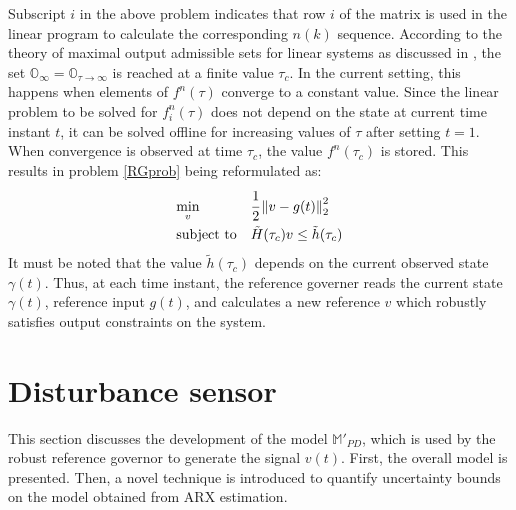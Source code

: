 \documentclass[letterpaper, 10 pt, conference]{ieeeconf}  %
\newcommand{\norm}[1]{\left\lVert#1\right\rVert}
\begin{document}
	Subscript $i$ in the above problem indicates that row $i$ of the matrix is used in the linear program to calculate the corresponding $n(k)$ sequence. According to the theory of maximal output admissible sets for linear systems as discussed in \cite{83532}, the set $\mathbb{O}_{\infty} = \mathbb{O}_{\tau \to \infty}$ is reached at a finite value $\tau_c$. In the current setting, this happens when elements of $f^n(\tau)$ converge to a constant value. Since the linear problem to be solved for $f_i^n(\tau)$ does not depend on the state at current time instant $t$, it can be solved offline for increasing values of $\tau$ after setting $t=1$. When convergence is observed at time $\tau_c$, the value $f^n(\tau_c)$ is stored. This results in  problem \eqref{RGprob} being reformulated as:
	\begin{equation}
	\begin{aligned}
	& \underset{v}{\text{min}}
	& & \cfrac{1}{2}\norm{v-g(t)}_2^2 \\
	& \text{subject to}
	& & 
	\tilde{H}(\tau_c)v \leq \tilde{h}(\tau_c)
	\end{aligned}
	\label{RGprob_simple}
	\end{equation}
	It must be noted that the value $\tilde{h}(\tau_c)$ depends on the current observed state $\gamma(t)$. Thus, at each time instant, the reference governer reads the current state $\gamma(t)$, reference input $g(t)$, and calculates a new reference $v$ which robustly satisfies output constraints on the system.
	\section{Disturbance sensor}
	\label{Contribution}
	This section discusses the development of the model $\mathbb{M}'_{PD}$, which is used by the robust reference governor to generate the signal $v(t)$. First, the overall model is presented. Then, a novel technique is introduced to quantify uncertainty bounds on the model obtained from ARX estimation.
\end{document}
